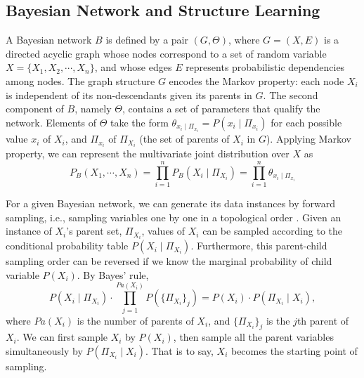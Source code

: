 \subsection{Bayesian Network and Structure Learning}
\label{BN_basic}
A Bayesian network $B$ is defined by a pair $(G,\Theta)$, where $G = (X,E)$ is a directed acyclic graph whose nodes correspond to a set of random variable $X = \{  X_1, X_2, \cdots, X_n \}$, and whose edges $E$ represents probabilistic dependencies among nodes. The graph structure $G$ encodes the Markov property: each node $X_i$ is independent of its non-descendants given its parents in $G$. The second component of $B$, namely $\Theta$, contains a set of parameters that qualify the network. Elements of $\Theta$ take the form $\theta_{x_i \mid \Pi_{x_i}} = P(x_i \mid \Pi_{x_i})$ for each possible value $x_i$ of $X_i$, and $\Pi_{x_i}$ of $\Pi_{X_i}$ (the set of parents of $X_i$ in $G$). Applying Markov property, we can represent the multivariate joint distribution over $X$ as
\begin{equation}
P_B (X_1 , \cdots, X_n) = \prod_{i=1}^{n} P_B (X_i \mid \Pi_{X_i}) = \prod_{i=1}^{n} \theta_{x_i \mid \Pi_{x_i}}
\end{equation}

For a given Bayesian network, we can generate its data instances by forward sampling, i.e., sampling variables one by one in a topological order \citep[see][chap.~22]{algo_2009}. Given an instance of $X_i$'s parent set, $\Pi_{X_i}$, values of $X_i$ can be sampled according to the conditional probability table $P(X_i \mid \Pi_{X_i})$. Furthermore, this parent-child sampling order can be reversed if we know the marginal probability of child variable $P(X_i)$. By Bayes' rule,
\begin{equation}
P(X_i \mid \Pi_{X_i}) \cdot \prod_{j = 1}^{ Pa( X_i)} P( \{ \Pi_{X_i} \}_j) = P(X_i) \cdot P(\Pi_{X_i} \mid X_i),
\end{equation}
where $Pa( X_i)$ is the number of parents of $X_i$, and $\{ \Pi_{X_i} \}_j$ is the $j$th parent of $X_i$. We can first sample $X_i$ by $P(X_i)$, then sample all the parent variables simultaneously by $P(\Pi_{X_i} \mid X_i)$. That is to say, $X_i$ becomes the starting point of sampling.

